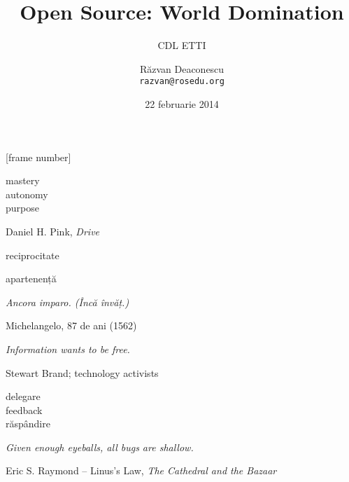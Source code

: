 \documentclass{beamer}
\title[Open Source]{Open Source: World Domination}
\subtitle{CDL ETTI}
\date{22 februarie 2014}
\author[Răzvan]{Răzvan Deaconescu \\ \texttt{razvan@rosedu.org}}
\begin{document}
[frame number]

\frame{\titlepage}

\begin{frame}{}
  \Large
  \begin{center}
    mastery \\
    autonomy \\
    purpose
  \end{center}
  \normalsize
  \hfill Daniel H. Pink, \textit{Drive}
\end{frame}

\begin{frame}{}
  \Large
  \begin{center}
    reciprocitate
  \end{center}
\end{frame}

\begin{frame}{}
  \Large
  \begin{center}
    apartenență
  \end{center}
\end{frame}

\begin{frame}{}
  \Large
  \begin{center}
    \textit{Ancora imparo. (Încă învăț.)}
  \end{center}
  \normalsize
  \hfill Michelangelo, 87 de ani (1562)
\end{frame}

\begin{frame}{}
  \Large
  \begin{center}
    \textit{Information wants to be free.}
  \end{center}
  \normalsize
  \hfill Stewart Brand; technology activists
\end{frame}

\begin{frame}{}
  \Large
  \begin{center}
    delegare \\
    feedback \\
    răspândire
  \end{center}
\end{frame}

\begin{frame}{}
  \Large
  \begin{center}
    \textit{Given enough eyeballs, all bugs are shallow.}
  \end{center}
  \normalsize
  \hfill Eric S. Raymond -- Linus's Law, \textit{The Cathedral and the Bazaar}
\end{frame}
\end{document}
